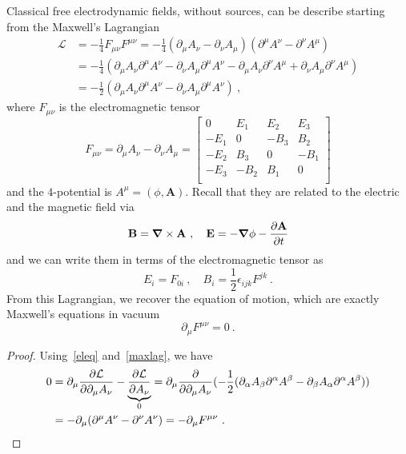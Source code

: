     Classical free electrodynamic fields, without sources, can be describe starting from the Maxwell's Lagrangian
    \begin{equation}\label{maxlag}
    \begin{aligned}
        \mathcal L & = - \frac{1}{4} F_{\mu\nu} F^{\mu\nu} = - \frac{1}{4} (\partial_\mu A_\nu - \partial_\nu A_\mu) (\partial^\mu A^\nu - \partial^\nu A^\mu) \\ & = - \frac{1}{4} ( \partial_\mu A_\nu \partial^\mu A^\nu - \partial_\nu A_\mu \partial^\mu A^\nu - \partial_\mu A_\nu \partial^\nu A^\mu + \partial_\nu A_\mu  \partial^\nu A^\mu ) \\ & = - \frac{1}{2} (\partial_\mu A_\nu \partial^\mu A^\nu - \partial_\nu A_\mu \partial^\mu A^\nu) ~,
    \end{aligned}
    \end{equation}
    where $F_{\mu\nu}$ is the electromagnetic tensor
    \begin{equation*}
        F_{\mu\nu} = \partial_\mu A_\nu - \partial_\nu A_\mu = \begin{bmatrix}
            0 & E_1 & E_2 & E_3 \\ 
            -E_1 & 0 & - B_3 & B_2 \\ 
            - E_2 & B_3 & 0 & - B_1 \\ 
            - E_3 & -B_2 & B_1 & 0 \\
        \end{bmatrix}
    \end{equation*}
    and the $4$-potential is $A^\mu = (\phi, \mathbf A)$. Recall that they are related to the electric and the magnetic field via 
    \begin{equation}\label{ef}
        \mathbf B = \boldsymbol \nabla \times \mathbf A ~, \quad \mathbf E = - \boldsymbol \nabla \phi - \frac{\partial\mathbf A}{\partial t} 
    \end{equation}
    and we can write them in terms of the electromagnetic tensor as 
    \begin{equation*}
        E_i = F_{0i} ~, \quad B_i = \frac{1}{2} \epsilon_{ijk} F^{jk} ~.
    \end{equation*}
    From this Lagrangian, we recover the equation of motion, which are exactly Maxwell's equations in vacuum
    \begin{equation*}
        \partial_\mu F^{\mu\nu} = 0 ~.
    \end{equation*}
    \begin{proof}
        Using~\eqref{eleq} and~\eqref{maxlag}, we have
        \begin{equation*}
        \begin{aligned}
            0 & = \partial_\mu \frac{\partial\mathcal L}{\partial\partial_\mu A_\nu} - \underbrace{\frac{\partial\mathcal L}{\partial A_\nu}}_0 = \partial_\mu \frac{\partial}{\partial\partial_\mu A_\nu} (- \frac{1}{2} (\partial_\alpha A_\beta \partial^\alpha A^\beta - \partial_\beta A_\alpha \partial^\alpha A^\beta)) \\ & = - \partial_\mu (\partial^\mu A^\nu - \partial^\nu A^\nu) = - \partial_\mu F^{\mu\nu} ~.
        \end{aligned}
        \end{equation*}
    \end{proof}

